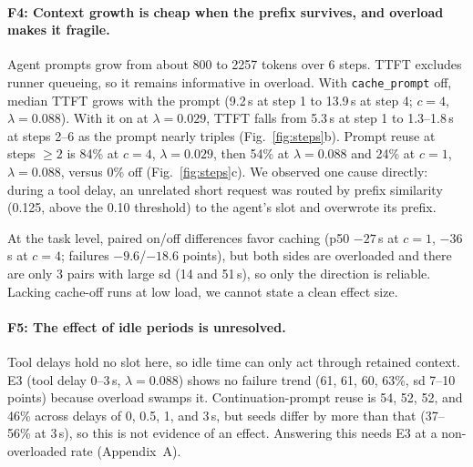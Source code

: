 \documentclass{article}
\begin{document}
\paragraph{F4: Context growth is cheap when the prefix survives, and overload makes it fragile.} Agent prompts grow from about 800 to 2257 tokens over 6 steps. TTFT excludes runner queueing, so it remains informative in overload. With \texttt{cache\_prompt} off, median TTFT grows with the prompt (9.2\,s at step 1 to 13.9\,s at step 4; $c{=}4$, $\lambda{=}0.088$). With it on at $\lambda{=}0.029$, TTFT falls from 5.3\,s at step 1 to 1.3--1.8\,s at steps 2--6 as the prompt nearly triples (Fig.~\ref{fig:steps}b). Prompt reuse at steps $\ge2$ is 84\% at $c{=}4$, $\lambda{=}0.029$, then 54\% at $\lambda{=}0.088$ and 24\% at $c{=}1$, $\lambda{=}0.088$, versus 0\% off (Fig.~\ref{fig:steps}c). We observed one cause directly: during a tool delay, an unrelated short request was routed by prefix similarity (0.125, above the 0.10 threshold) to the agent's slot and overwrote its prefix.

At the task level, paired on/off differences favor caching (p50 $-27$\,s at $c{=}1$, $-36$\,s at $c{=}4$; failures $-9.6$/$-18.6$ points), but both sides are overloaded and there are only 3 pairs with large sd (14 and 51\,s), so only the direction is reliable. Lacking cache-off runs at low load, we cannot state a clean effect size.

\paragraph{F5: The effect of idle periods is unresolved.} Tool delays hold no slot here, so idle time can only act through retained context. E3 (tool delay 0--3\,s, $\lambda{=}0.088$) shows no failure trend (61, 61, 60, 63\%, sd 7--10 points) because overload swamps it. Continuation-prompt reuse is 54, 52, 52, and 46\% across delays of 0, 0.5, 1, and 3\,s, but seeds differ by more than that (37--56\% at 3\,s), so this is not evidence of an effect. Answering this needs E3 at a non-overloaded rate (Appendix~A).
\end{document}
